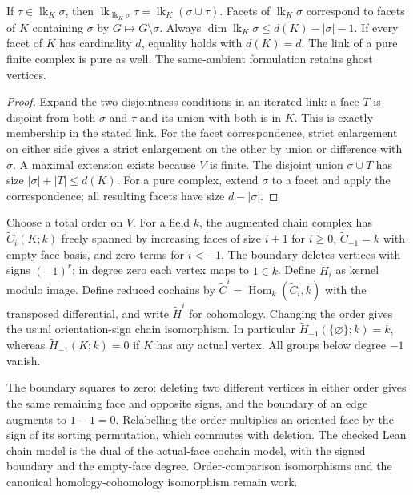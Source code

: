 \begin{lemma}\label{lem:link-calculus}
If $\tau\in\operatorname{lk}_K\sigma$, then
$\operatorname{lk}_{\operatorname{lk}_K\sigma}\tau
=\operatorname{lk}_K(\sigma\cup\tau)$.
Facets of $\operatorname{lk}_K\sigma$ correspond to facets of $K$ containing
$\sigma$ by $G\mapsto G\setminus\sigma$.
Always $\dim\operatorname{lk}_K\sigma\le d(K)-|\sigma|-1$.
If every facet of $K$ has cardinality $d$, equality holds with $d(K)=d$.
The link of a pure finite complex is pure as well. The same-ambient
formulation retains ghost vertices.
\leanok
\end{lemma}
\begin{proof}
Expand the two disjointness conditions in an iterated link: a face $T$ is
disjoint from both $\sigma$ and $\tau$ and its union with both is in $K$.
This is exactly membership in the stated link. For the facet correspondence,
strict enlargement on either side gives a strict enlargement on the other by
union or difference with $\sigma$. A maximal extension exists because $V$ is
finite. The disjoint union $\sigma\cup T$ has size $|\sigma|+|T|\le d(K)$.
For a pure complex, extend $\sigma$ to a facet and apply the correspondence;
all resulting facets have size $d-|\sigma|$.
\end{proof}

\begin{definition}\label{def:homology}
Choose a total order on $V$. For a field $k$, the augmented chain complex has
$\widetilde C_i(K;k)$ freely spanned by increasing faces of size $i+1$ for
$i\ge0$, $\widetilde C_{-1}=k$ with empty-face basis, and zero terms for
$i<-1$. The boundary deletes vertices with signs $(-1)^r$; in degree zero
each vertex maps to $1\in k$. Define $\widetilde H_i$ as kernel modulo image.
Define reduced cochains by $\widetilde C^i=\operatorname{Hom}_k(\widetilde C_i,k)$
with the transposed differential, and write $\widetilde H^i$ for cohomology.
Changing the order gives the usual orientation-sign chain isomorphism.
In particular $\widetilde H_{-1}(\{\varnothing\};k)=k$, whereas
$\widetilde H_{-1}(K;k)=0$ if $K$ has any actual vertex. All groups below
degree $-1$ vanish.
\end{definition}
The boundary squares to zero: deleting two different vertices in either
order gives the same remaining face and opposite signs, and the boundary
of an edge augments to $1-1=0$. Relabelling the order multiplies an oriented
face by the sign of its sorting permutation, which commutes with deletion.
The checked Lean chain model is the dual of the actual-face cochain model,
with the signed boundary and the empty-face degree. Order-comparison
isomorphisms and the canonical homology-cohomology isomorphism remain work.

